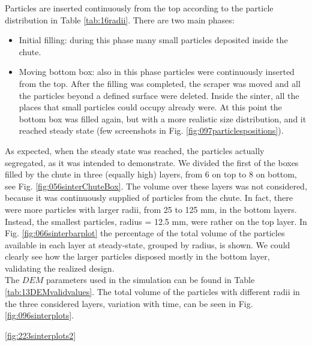 
Particles are inserted continuously from the top according to the particle
distribution in Table \ref{tab:16radii}.
There are two main phases:
\begin{itemize}
  \item{Initial filling: during this phase many small particles deposited inside
  the chute.}
  \item{Moving bottom box: also in this phase particles were
continuously inserted from the top. After the filling was completed, the
scraper was moved and all the particles beyond a defined surface were
deleted. Inside the sinter, all the places that small particles could
occupy already were. At this point the bottom box was filled again, but
with a more realistic size distribution, and it reached steady state 
(few screenshots in Fig. \ref{fig:097particlespositions}).}
\end{itemize}
As expected, when the steady state was reached, the particles actually
segregated, as it was intended to demonstrate.
We divided the first of the boxes
filled by the chute in three (equally high) layers, from 6 on top to 8 
on bottom, see Fig. \ref{fig:056sinterChuteBox}. 
The volume over these layers was not considered, because it was continuously 
supplied of particles from the chute.
In fact, there were more particles with larger radii, from 25 to 125 mm, in the
bottom layers.
Instead, the smallest particles, radius = 12.5 mm, were rather on the top layer. 
In Fig. \ref{fig:066sinterbarplot} the
percentage of the total volume of the particles available in each layer at steady-state, 
grouped by radius, is shown. 
We could clearly see how the larger particles disposed mostly 
in the bottom layer, validating the realized design.\\
The $DEM$ parameters used in the simulation can be found in Table
\ref{tab:13DEMvalidvalues}.
The total volume of the particles with different radii in the three considered
layers, variation with time, can
be seen in Fig. \ref{fig:096sinterplots}.

\ref{fig:223sinterplots2}\\






